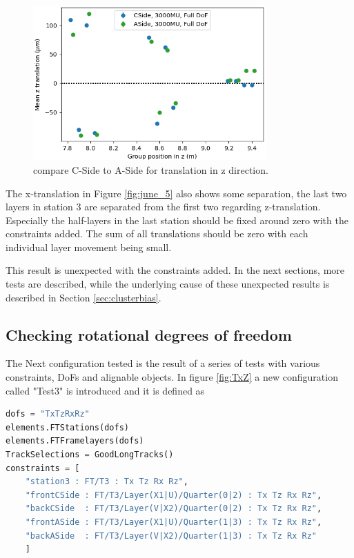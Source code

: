 \begin{figure}
  \centering
  \includegraphics[width=0.8\textwidth]{plots/renewed_plots/CA_allT_halfT3_Tz.png}
  \caption{compare C-Side to A-Side for translation in z direction.}
  \label{fig:june_6}
\end{figure}

The x-translation in Figure \ref{fig:june_5} also shows some separation, the last two layers in station 3 are separated from the first two regarding z-translation. Especially the half-layers in the last station should be fixed around zero with the constraints added. The sum of all translations should be zero with each individual layer movement being small.

This result is unexpected with the constraints added. In the next sections, more tests are described, while the underlying cause of these unexpected results is described in Section \ref{sec:clusterbias}.

\subsection{Checking rotational degrees of freedom}
\label{sec:test_and_c5}
The Next configuration tested is the result of a series of tests with various constraints, DoFs and alignable objects. In figure \ref{fig:TxZ} a new configuration called "Test3" is introduced and it is defined as

\begin{lstlisting}[language=Python]
dofs = "TxTzRxRz"
elements.FTStations(dofs)
elements.FTFramelayers(dofs)
TrackSelections = GoodLongTracks()
constraints = [
    "station3 : FT/T3 : Tx Tz Rx Rz",
    "frontCSide : FT/T3/Layer(X1|U)/Quarter(0|2) : Tx Tz Rx Rz",
    "backCSide  : FT/T3/Layer(V|X2)/Quarter(0|2) : Tx Tz Rx Rz",
    "frontASide : FT/T3/Layer(X1|U)/Quarter(1|3) : Tx Tz Rx Rz",
    "backASide  : FT/T3/Layer(V|X2)/Quarter(1|3) : Tx Tz Rx Rz"
    ]
\end{lstlisting}

